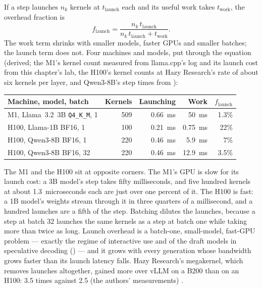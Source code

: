 If a step launches $n_k$ kernels at $t_{\text{launch}}$ each and its useful
work takes $t_{\text{work}}$, the overhead fraction is
\begin{equation}
f_{\text{launch}} = \frac{n_k\,t_{\text{launch}}}{n_k\,t_{\text{launch}} + t_{\text{work}}}.
\label{eq:launch-fraction}
\end{equation}
The work term shrinks with smaller models, faster GPUs and smaller batches;
the launch term does not. Four machines and models, put through the equation
(derived; the M1's kernel count measured from llama.cpp's log and its launch
cost from this chapter's lab, the H100's kernel counts at Hazy Research's rate
of about six kernels per layer, and Qwen3-8B's step times from
):

\begin{center}\small
\begin{tabular}{@{}lrrrr@{}}
\toprule
Machine, model, batch & Kernels & Launching & Work & $f_{\text{launch}}$ \\
\midrule
M1, Llama~3.2~3B \texttt{Q4\_K\_M}, 1 & 509 & 0.66~ms & 50~ms & 1.3\% \\
H100, Llama-1B BF16, 1 & 100 & 0.21~ms & 0.75~ms & 22\% \\
H100, Qwen3-8B BF16, 1 & 220 & 0.46~ms & 5.9~ms & 7\% \\
H100, Qwen3-8B BF16, 32 & 220 & 0.46~ms & 12.9~ms & 3.5\% \\
\bottomrule
\end{tabular}
\end{center}

The M1 and the H100 sit at opposite corners. The M1's GPU is slow for its
launch cost: a 3B model's step takes fifty milliseconds, and five hundred
kernels at about 1.3~microseconds each are just over one percent of it. The
H100 is fast: a 1B model's weights stream through it in three quarters of a
millisecond, and a hundred launches are a fifth of the step. Batching dilutes
the launches, because a step at batch 32 launches the same kernels as a step
at batch one while taking more than twice as long. Launch overhead is a
batch-one, small-model, fast-GPU problem --- exactly the regime of interactive
use and of the draft models in speculative decoding
() --- and it grows with every generation whose
bandwidth grows faster than its launch latency falls. Hazy Research's
megakernel, which removes launches altogether, gained more over vLLM on a B200
than on an H100: 3.5 times against 2.5 (the authors' measurements)
\cite{spector2025megakernel}.

